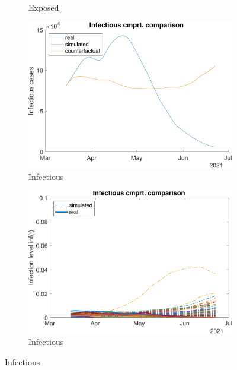 \begin{figure}[hbtp]
\begin{subfigure}[b]{.45\linewidth}
         \caption{Exposed}
         \label{fig:compCombWave3Exp}
     \end{subfigure}
     \newline
     \begin{subfigure}[b]{.45\linewidth}
         \centering
         \includegraphics[width=\linewidth]{img/210907_224100_combined_wave3/figures/COMP_inf}
         \caption{Infectious}
         \label{fig:compAggrCombWave3Inf}
     \end{subfigure}
     \hfill
     \begin{subfigure}[b]{.45\linewidth}
         \centering
         \includegraphics[width=\linewidth]{img/210907_224100_combined_wave3/figures/SEIR_i_sim-vs-real}
         \caption{Infectious}
         \label{fig:compCombWave3Inf}
     \end{subfigure}

\end{figure}
